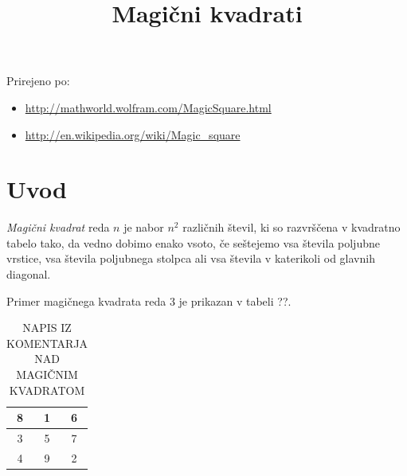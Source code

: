 \documentclass[a4paper,12pt]{article}
\title{Magični kvadrati}\date{}
\begin{document}
\maketitle

Prirejeno po:

\begin{itemize}
   \item\url{http://mathworld.wolfram.com/MagicSquare.html} 
   \item\url{http://en.wikipedia.org/wiki/Magic_square} 
\end{itemize}
\tableofcontents


\newpage

\section{Uvod}

   \emph{Magični kvadrat} reda \(n\) je nabor \(n^2\) različnih števil,
   ki so razvrščena v kvadratno tabelo tako, da vedno dobimo enako vsoto,
   če seštejemo vsa števila poljubne vrstice, vsa števila poljubnega
   stolpca ali vsa števila v katerikoli od glavnih diagonal.

Primer magičnega kvadrata reda 3 je prikazan v tabeli ??. %

\begin{table}[!ht]
\centering
\caption{NAPIS IZ KOMENTARJA NAD MAGIČNIM KVADRATOM}
\label{OZNAKA IZ KOMENTARJA NAD MAGIČNIM KVADRATOM}
\large
\begin{tabular}{|c|c|c|}
\hline
8 & 1 & 6 \\ \hline
3 & 5 & 7 \\ \hline
4 & 9 & 2 \\ \hline
\end{tabular}
\normalsize
\end{table}
\end{document}
